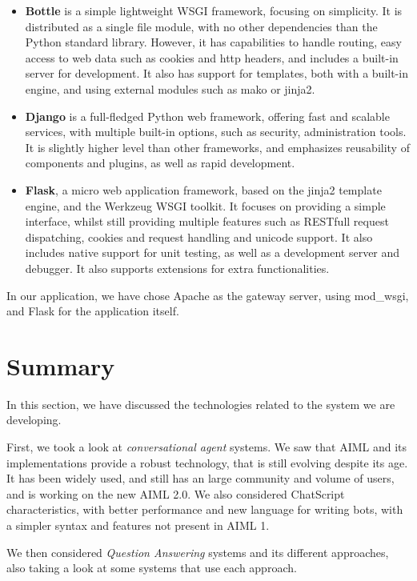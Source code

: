 \begin{itemize}
 \item \textbf{Bottle} is a simple lightweight WSGI framework, focusing on simplicity. It is distributed as a single file module, with no other dependencies than the Python standard library. However, it has capabilities to handle routing, easy access to web data such as cookies and http headers, and includes a built-in server for development. It also has support for templates, both with a built-in engine, and using external modules such as mako or jinja2.
 \item \textbf{Django} is a full-fledged Python web framework, offering fast and scalable services, with multiple built-in options, such as security, administration tools. It is slightly higher level than other frameworks, and emphasizes reusability of components and plugins, as well as rapid development. %
 \item \textbf{Flask}, a micro web application framework, based on the jinja2 template engine, and the Werkzeug WSGI toolkit. It focuses on providing a simple interface, whilst still providing multiple features such as RESTfull request dispatching, cookies and request handling and unicode support. It also includes native support for unit testing, as well as a development server and debugger. It also supports extensions for extra functionalities.
\end{itemize}

In our application, we have chose Apache as the gateway server, using mod\_wsgi, and Flask for the application itself. 

\section{Summary}

In this section, we have discussed the technologies related to the system we are developing.

First, we took a look at \emph{conversational agent} systems. We saw that AIML and its implementations provide a robust technology, that is still evolving despite its age. It has been widely used, and still has an large community and volume of users, and is working on the new AIML 2.0. We also considered ChatScript characteristics, with better performance and new language for writing bots, with a simpler syntax and features not present in AIML 1.

We then considered \emph{Question Answering} systems and its different approaches, also taking a look at some systems that use each approach.

